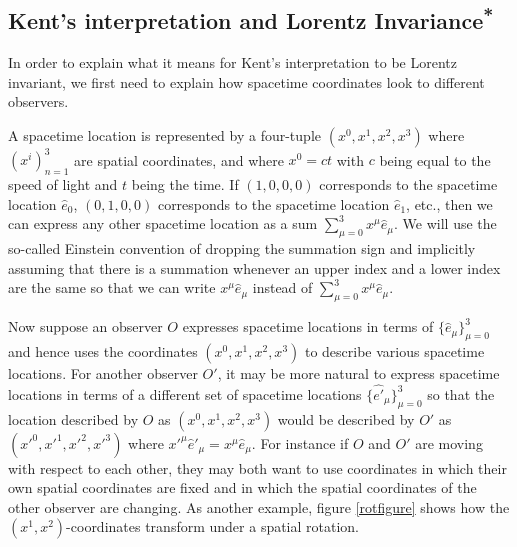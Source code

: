 \subsection{Kent's interpretation and Lorentz Invariance\label{LorentzInvariance}\textsuperscript{*}}
In order to explain what it means for Kent's interpretation to be Lorentz invariant, we first need to explain how spacetime coordinates look to different observers. 

A spacetime location is represented by a four-tuple $(x^0, x^1, x^2, x^3)$ where $(x^i)_{n=1}^3$ are spatial coordinates, and where $x^0=ct$ with $c$ being equal to the speed of light and $t$ being the time. If $(1,0,0,0)$ corresponds to the spacetime location $\hat{e}_0$, $(0,1,0,0)$ corresponds to the spacetime location $\hat{e}_1$, etc., then we can express any other spacetime location  as a sum $\sum_{\mu=0}^3x^\mu\hat{e}_\mu$. We will use the so-called Einstein convention of dropping the summation sign and implicitly assuming that there is a summation whenever an upper index and a lower index are the same so that we can write $x^\mu\hat{e}_\mu$ instead of $\sum_{\mu=0}^3x^\mu\hat{e}_\mu$.  

Now suppose an observer $O$ expresses spacetime locations in terms of $\{\hat{e}_\mu\}_{\mu=0}^3$ and hence uses the coordinates $(x^0, x^1, x^2, x^3)$ to describe various spacetime locations. For another observer $O'$, it may be more natural to express spacetime locations in terms of a different set of spacetime locations $\{\hat{e'}_\mu\}_{\mu=0}^3$ so that the location described by $O$ as $(x^0, x^1, x^2, x^3)$ would be described by $O'$ as $({x'}^0, {x'}^1, {x'}^2, {x'}^3)$ where ${x'}^\mu{\hat{e}'}_\mu=x^\mu\hat{e}_\mu$.  For instance if $O$ and $O'$ are moving with respect to each other, they may both want to use coordinates in which their own spatial coordinates are fixed and in which the spatial coordinates of the other observer are changing. As another example, figure \ref{rotfigure} shows how the $(x^1, x^2)$-coordinates transform under a spatial rotation. 


